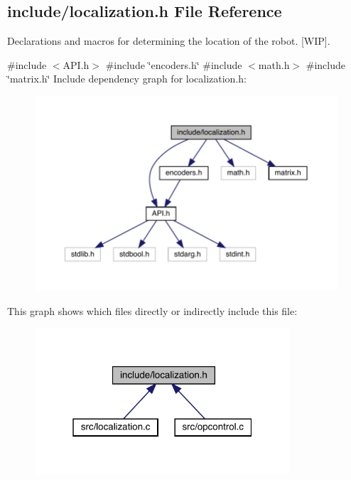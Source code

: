 \subsection{include/localization.h File Reference}
\label{localization_8h}


Declarations and macros for determining the location of the robot. [W\+IP].  


{\ttfamily \#include $<$A\+P\+I.\+h$>$}\newline
{\ttfamily \#include \char`\"{}encoders.\+h\char`\"{}}\newline
{\ttfamily \#include $<$math.\+h$>$}\newline
{\ttfamily \#include \char`\"{}matrix.\+h\char`\"{}}\newline
Include dependency graph for localization.\+h\+:\nopagebreak
\begin{figure}[H]
\begin{center}
\leavevmode
\includegraphics[width=350pt]{localization_8h__incl}
\end{center}
\end{figure}
This graph shows which files directly or indirectly include this file\+:\nopagebreak
\begin{figure}[H]
\begin{center}
\leavevmode
\includegraphics[width=268pt]{localization_8h__dep__incl}
\end{center}
\end{figure}
